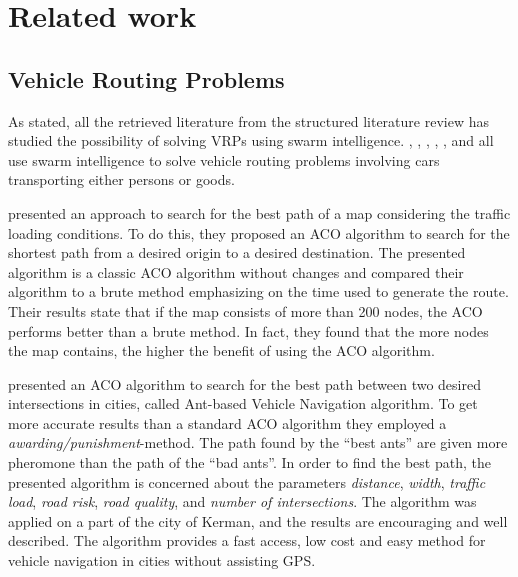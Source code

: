 \section{Related work}
\label{sec:relatedWork}



\subsection{Vehicle Routing Problems}
\label{subsec:relatedWorkVRP}

As stated, all the retrieved literature from the structured literature review has studied the possibility of solving VRPs using swarm intelligence. \citet{hsiao04}, \citet{salehi-nezhad07}, \citet{tripathi09}, \citet{dias14}, \citet{salehinejad10}, and \citet{sedighpour14} all use swarm intelligence to solve vehicle routing problems involving cars transporting either persons or goods.

\citet{hsiao04} presented an approach to search for the best path of a map considering the traffic loading conditions. To do this, they proposed an ACO algorithm to search for the shortest path from a desired origin to a desired destination. The presented algorithm is a classic ACO algorithm without changes and compared their algorithm to a brute method emphasizing on the time used to generate the route. Their results state that if the map consists of more than 200 nodes, the ACO performs better than a brute method. In fact, they found that the more nodes the map contains, the higher the benefit of using the ACO algorithm. 

\citet{salehi-nezhad07} presented an ACO algorithm to search for the best path between two desired intersections in cities, called Ant-based Vehicle Navigation algorithm. To get more accurate results than a standard ACO algorithm they employed a \textit{awarding/punishment}-method. The path found by the ``best ants'' are given more pheromone than the path of the ``bad ants''. In order to find the best path, the presented algorithm is concerned about the parameters \textit{distance}, \textit{width}, \textit{traffic load}, \textit{road risk}, \textit{road quality}, and \textit{number of intersections}. The algorithm was applied on a part of the city of Kerman, and the results are encouraging and well described. The algorithm provides a fast access, low cost and easy method for vehicle navigation in cities without assisting GPS.

